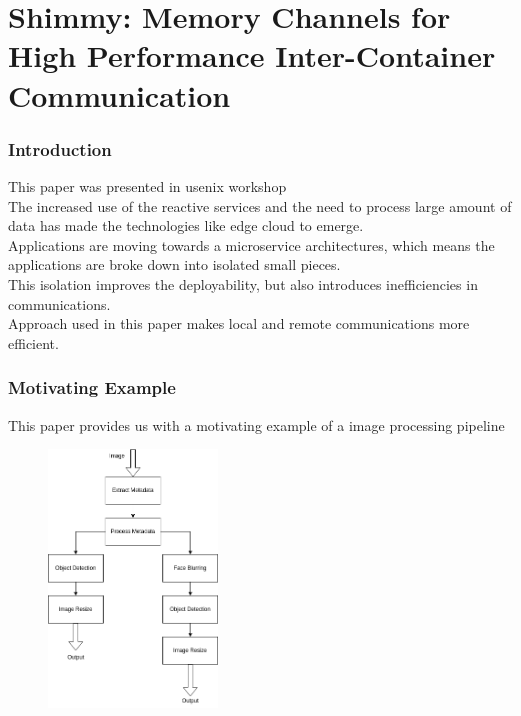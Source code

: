\documentclass{beamer}
\begin{document}
\section{Shimmy: Memory Channels for High
    Performance Inter-Container Communication}
\begin{frame}
    \frametitle{Introduction}
    This paper was presented in usenix workshop \cite{abranches2019shimmy} \\
    The increased use of the reactive services and the need to process large
    amount of data has made the technologies like edge cloud to emerge. \\
    Applications are moving towards a microservice architectures, which means
    the applications are broke down into isolated small pieces. \\
    This isolation improves the deployability, but also introduces
    inefficiencies in communications. \\
    Approach used in this paper makes local and remote 
    communications more efficient.
\end{frame}

\begin{frame}
    \frametitle{Motivating Example}
    This paper provides us with a motivating example of a image processing
    pipeline
    \begin{figure}
        \centering
        \includegraphics[width=0.4\textwidth]{pipeline.png}
        \label{fig:pipe}
    \end{figure}
\end{frame}
\end{document}
